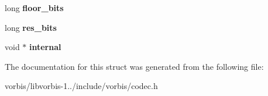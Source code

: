 \begin{DoxyCompactItemize}
\item 
\hypertarget{structvorbis__block_ac96102ac7115856ff07be7cebeb6de37}{long {\bfseries floor\+\_\+bits}}\label{structvorbis__block_ac96102ac7115856ff07be7cebeb6de37}

\item 
\hypertarget{structvorbis__block_a3c91d73c477db77f4b85ded0fdcb607c}{long {\bfseries res\+\_\+bits}}\label{structvorbis__block_a3c91d73c477db77f4b85ded0fdcb607c}

\item 
\hypertarget{structvorbis__block_ab506fee4272b6e8c634516c1cbb1e638}{void $\ast$ {\bfseries internal}}\label{structvorbis__block_ab506fee4272b6e8c634516c1cbb1e638}

\end{DoxyCompactItemize}


The documentation for this struct was generated from the following file\+:\begin{DoxyCompactItemize}
\item 
vorbis/libvorbis-\/1../include/vorbis/codec.\+h\end{DoxyCompactItemize}
